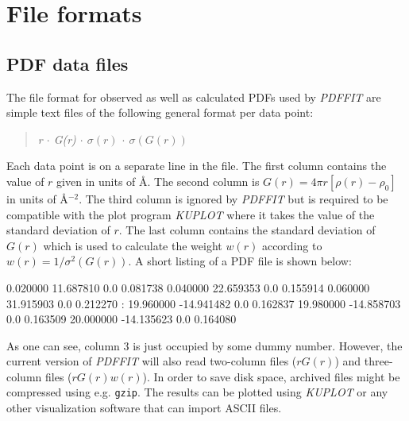 
\chapter{File formats \label{file}}
\section{PDF data files \label{file_pdf}}

The file format for observed as well as calculated PDFs used by
{\it PDFFIT} are simple text files of the following general format
per data point:

\begin{quote}
  {\it r $\cdot$ G(r) $\cdot$  $\sigma(r)$ $\cdot$ $\sigma(G(r))$}
\end{quote}

Each data point is on a separate line in the file. The first column
contains the value of $r$ given in units of \AA. The second column
is $G(r) = 4 \pi r [\rho(r) - \rho_{0}]$ in units of \AA$^{-2}$. The
third column is ignored by {\it PDFFIT} but is required to be
compatible with the plot program {\it KUPLOT} where it takes the
value of the standard deviation of $r$. The last column contains the
standard deviation of $G(r)$ which is used to calculate the weight
$w(r)$ according to $w(r) = 1/\sigma^{2}(G(r))$. A short listing of
a PDF file is shown below:

\begin{MacVerbatim}
     0.020000    11.687810      0.0       0.081738
     0.040000    22.659353      0.0       0.155914
     0.060000    31.915903      0.0       0.212270
        :
    19.960000   -14.941482      0.0       0.162837
    19.980000   -14.858703      0.0       0.163509
    20.000000   -14.135623      0.0       0.164080
\end{MacVerbatim}

As one can see, column 3 is just occupied by some dummy number.
However, the current version of {\it PDFFIT} will also read
two-column files ($r G(r)$) and three-column files ($r G(r) w(r)$).
In order to save disk space, archived files might be compressed
using e.g. {\tt gzip}. The results can be plotted using {\it KUPLOT}
or any other visualization software that can import ASCII files.


